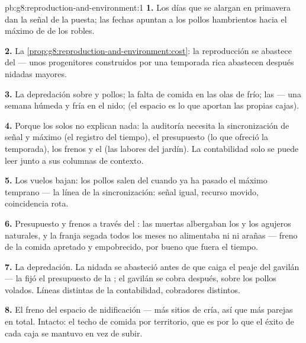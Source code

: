 \begin{solution}{pb:g8:reproduction-and-environment:1}
\textbf{1.} Los días que se alargan en primavera dan la señal de la
puesta; las fechas apuntan a los pollos hambrientos hacia el máximo de
 de los robles.

\textbf{2.} La \cref{prop:g8:reproduction-and-environment:cost}: la
reproducción se abastece del  --- unos progenitores construidos
por una temporada rica abastecen después nidadas mayores.

\textbf{3.} La depredación sobre  y pollos; la falta de comida en
las olas de frío; las  --- una semana húmeda y fría en el
nido; (el espacio es lo que aportan las propias cajas).

\textbf{4.} Porque los  solos no explican nada: la auditoría
necesita la sincronización de señal y máximo (el registro del tiempo),
el presupuesto (lo que ofreció la temporada), los frenos y el 
(las labores del jardín). La contabilidad solo se puede leer junto a
sus columnas de contexto.

\textbf{5.} Los vuelos bajan: los pollos salen del  cuando ya ha
pasado el máximo temprano --- la línea de la sincronización: señal
igual, recurso movido, coincidencia rota.

\textbf{6.} Presupuesto y frenos a través del : las 
muertas albergaban los  y los agujeros naturales, y la franja
segada todos los meses no alimentaba ni  ni arañas --- freno de
la comida apretado y  empobrecido, por bueno que fuera el
tiempo.

\textbf{7.} La depredación. La nidada se abasteció antes de que caiga
el peaje del gavilán --- la fijó el presupuesto de la ; el
gavilán se cobra después, sobre los pollos volados. Líneas distintas de
la contabilidad, cobradores distintos.

\textbf{8.} El freno del espacio de nidificación --- más sitios de
cría, así que más parejas en total. Intacto: el techo de comida por
territorio, que es por lo que el éxito de cada caja se mantuvo en vez
de subir.


\end{solution}
